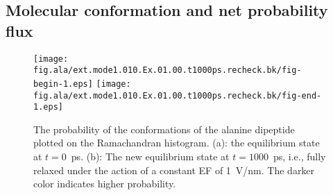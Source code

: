 \documentclass[a4paper,preprint,unsortedaddress,onecolumn]{revtex4-1}
\begin{document}

\subsection{Molecular conformation and net probability flux}

\begin{figure}
  \centering
  \texttt{[image: fig.ala/ext.mode1.010.Ex.01.00.t1000ps.recheck.bk/fig-begin-1.eps]}
  \texttt{[image: fig.ala/ext.mode1.010.Ex.01.00.t1000ps.recheck.bk/fig-end-1.eps]}
  \caption{The probability of the conformations of the alanine dipeptide plotted on the Ramachandran histogram.
    (a): the
    equilibrium state at $t=0$~\textsf{ps}. (b): The new equilibrium
    state at $t=1000$~\textsf{ps}, i.e., fully relaxed under the
    action of a constant EF of 1~V/nm. The darker color
    indicates higher probability.}
  \label{fig:tmp4}
\end{figure}
\end{document}
